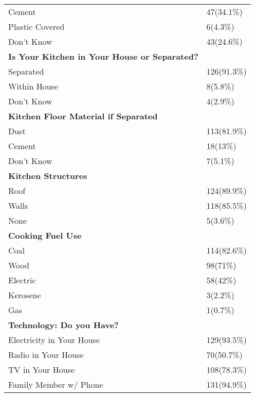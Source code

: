 \documentclass[6pt,letterpaper]{article}
\begin{document}
\begin{tabular}{|l  l|}
Cement & 47(34.1\%) \\
Plastic Covered & 6(4.3\%) \\
Don't Know & 43(24.6\%) \\
\hline
\textbf{Is Your Kitchen in Your House or Separated?} \\
\hline
Separated & 126(91.3\%) \\
Within House & 8(5.8\%) \\
Don't Know & 4(2.9\%) \\
\hline
\textbf{Kitchen Floor Material if Separated} \\ 
\hline
Dust & 113(81.9\%) \\
Cement & 18(13\%) \\
Don't Know & 7(5.1\%) \\
\hline
\textbf{Kitchen Structures} \\
\hline
Roof & 124(89.9\%) \\
Walls & 118(85.5\%) \\
None & 5(3.6\%) \\
\hline
\textbf{Cooking Fuel Use} \\
\hline
Coal & 114(82.6\%) \\
Wood & 98(71\%) \\
Electric & 58(42\%) \\
Kerosene & 3(2.2\%) \\
Gas & 1(0.7\%) \\
\hline
\textbf{Technology: Do you Have?} \\
\hline
Electricity in Your House & 129(93.5\%) \\
Radio in Your House & 70(50.7\%) \\
TV in Your House & 108(78.3\%) \\
Family Member w/ Phone & 131(94.9\%) \\
\hline
\end{tabular}
\end{document}

